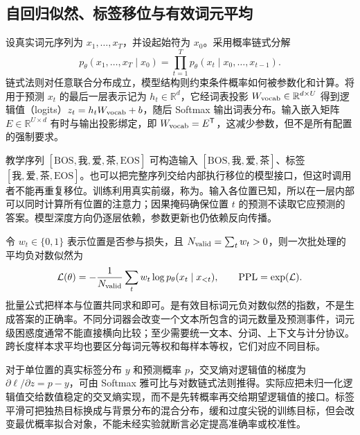 \documentclass[UTF8,12pt,a4paper,fontset=fandol]{ctexart}
\begin{document}
\subsection{自回归似然、标签移位与有效词元平均}

设真实词元序列为 $x_1,\ldots,x_T$，并设起始符为 $x_0$。采用概率链式分解
\begin{equation}
p_\theta(x_1,\ldots,x_T\mid x_0)
=\prod_{t=1}^T p_\theta(x_t\mid x_0,\ldots,x_{t-1}).
\label{eq:tr-autoreg}
\end{equation}
链式法则对任意联合分布成立，模型结构则约束条件概率如何被参数化和计算。将用于预测 $x_t$ 的最后一层表示记为 $h_t\in\mathbb R^d$，它经词表投影 $W_{\rm vocab}\in\mathbb R^{d\times U}$ 得到逻辑值（logits）$z_t=h_tW_{\rm vocab}+b$，随后 Softmax 输出词表分布。输入嵌入矩阵 $E\in\mathbb R^{U\times d}$ 有时与输出投影绑定，即 $W_{\rm vocab}=E^{\mathsf T}$，这减少参数，但不是所有配置的强制要求。

教学序列 $[\mathrm{BOS},\text{我},\text{爱},\text{茶},\mathrm{EOS}]$ 可构造输入 $[\mathrm{BOS},\text{我},\text{爱},\text{茶}]$、标签 $[\text{我},\text{爱},\text{茶},\mathrm{EOS}]$。也可以把完整序列交给内部执行移位的模型接口，但这时调用者不能再重复移位。训练利用真实前缀，称为。输入各位置已知，所以在一层内部可以同时计算所有位置的注意力；因果掩码确保位置 $t$ 的预测不读取它应预测的答案。模型深度方向仍逐层依赖，参数更新也仍依赖反向传播。

令 $w_t\in\{0,1\}$ 表示位置是否参与损失，且 $N_{\rm valid}=\sum_t w_t>0$，则一次批处理的平均负对数似然为
\begin{equation}
\mathcal L(\theta)=-\frac{1}{N_{\rm valid}}
\sum_t w_t\log p_\theta(x_t\mid x_{<t}),
\qquad \operatorname{PPL}=\exp(\mathcal L).
\label{eq:tr-loss}
\end{equation}
批量公式把样本与位置共同求和即可。是有效目标词元负对数似然的指数，不是生成答案的正确率。不同分词器会改变一个文本所包含的词元数量及预测事件，词元级困惑度通常不能直接横向比较；至少需要统一文本、分词、上下文与计分协议。跨长度样本求平均也要区分每词元等权和每样本等权，它们对应不同目标。

对于单位置的真实标签分布 $y$ 和预测概率 $p$，交叉熵对逻辑值的梯度为 $\partial\ell/\partial z=p-y$，可由 Softmax 雅可比与对数链式法则推得。实际应把未归一化逻辑值交给数值稳定的交叉熵实现，而不是先转概率再交给期望逻辑值的接口。标签平滑可把独热目标换成与背景分布的混合分布，缓和过度尖锐的训练目标，但会改变最优概率拟合对象，不能未经实验就断言必定提高准确率或校准性。
\end{document}
